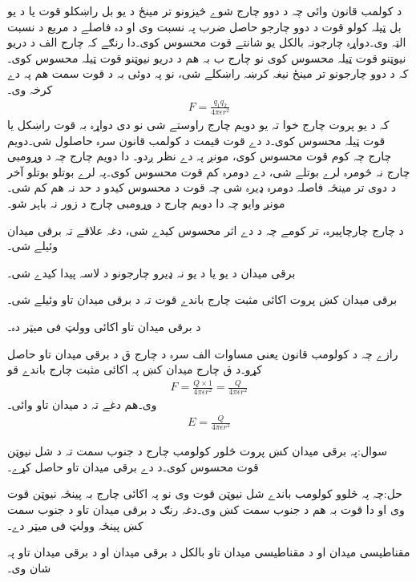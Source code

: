   د کولمب قانون وائی چہ د دوو چارج شوے څیزونو تر مینځ د یو بل راښکلو قوت یا د یو بل ټیلہ کولو قوت د دوو چارجو حاصل ضرب پہ نسبت وی او دہ فاصلے د مربع د نسبت الټہ وی۔دواړہ چارجونہ بالکل یو شانتے قوت محسوس کوی۔دا رنګے کہ چارج الف د دریو نیوټنو قوت ټیلہ محسوس کوی نو چارج ب بہ ھم د دریو نیوټنو قوت ټیلہ محسوس کوی۔کہ د دوو چارجونو تر مینځ نیغہ کرښہ راښکلے شی، نو پہ دوئی بہ د قوت سمت ھم پہ دے کرخہ وی۔  
\begin{align}\label{مساوات_بنیادی_کولمب_کا_قانون}
F=\frac{q_1 q_2}{4 \pi \epsilon r^2}
\end{align}
کہ د یو پروت چارج خوا تہ یو دویم چارج راوستے شی نو دی دواړہ بہ قوت راښکل یا قوت ټیلہ محسوس کوی۔د دے قوت قیمت د کولمب قانون سرہ حاصلول شی۔دویم چارج چہ کوم قوت محسوس کوی، مونږ پہ دے نظر ږدو۔ دا دویم چارج چہ د وړومبی چارج نہ څومرہ لرے بوتلے شی، دے دومرہ کم قوت محسوس کوی۔پہ لرے بوتلو بوتلو آخر د دوی تر مینځہ فاصلہ دومرہ ډیرہ شی چہ قوت د محسوس کیدو د حد نہ ھم کم شی۔مونږ وایو چہ دا دویم چارج د وړومبی چارج د زور نہ باہر شو۔

د چارج چارچاپیرہ، تر کومے چہ د دے اثر محسوس کیدے شی، دغہ  علاقے تہ  برقی میدان وئیلے شی۔

برقی میدان د یو یا د یو نہ ډیرو چارجونو د لاسہ پیدا کیدے شی۔

برقی میدان کښ پروت اکائی مثبت چارج باندے قوت تہ د برقی میدان تاو وئیلے شی۔

د برقی میدان تاو اکائی وولټ فی میټر دہ۔

   رازے چہ د کولومب قانون یعنی مساوات الف  سرہ د چارج ق د برقی میدان تاو حاصل کړو۔د ق چارج میدان کښ   پہ اکائی مثبت چارج  باندے قو
\begin{align}
F=\frac{Q \times 1}{4 \pi \epsilon r^2}=\frac{Q}{4\pi\epsilon r^2}
\end{align}
وی۔ھم دغے تہ د میدان تاو وائی۔
\begin{align}
E=\frac{Q}{4\pi\epsilon r^2}
\end{align}


سوال:پہ برقی میدان کښ پروت څلور کولومب چارج د جنوب سمت تہ د شل نیوټن قوت محسوس کوی۔د دے برقی میدان تاو حاصل کړے۔

حل:چہ پہ څلوو کولومب باندے شل نیوټن قوت وی نو پہ اکائی چارج بہ پینځہ نیوټن قوت وی او دا قوت بہ ھم د جنوب سمت کښ وی۔دغہ رنګ د برقی میدان تاو د جنوب سمت کښ پینځہ وولټ فی میټر دے۔

مقناطیسی میدان او د مقناطیسی میدان تاو بالکل د برقی میدان او د برقی میدان تاو پہ شان وی۔

